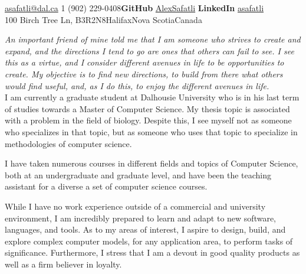 \documentclass[10pt,a4paper]{article}
\begin{document}
 


\noindent\href{mailto:asafatli@dal.ca}{asafatli@dal.ca}\bull
\textsmaller{+}1 (902) 229-0408\bull \textbf{GitHub} \href{https://github.com/AlexSafatli/}{AlexSafatli}\bull
\textbf{LinkedIn} \href{http://ca.linkedin.com/in/asafatli}{asafatli}\\
100 Birch Tree Ln, B3R2N8\bull Halifax\bull Nova Scotia\bull Canada

\spacedhrule{0.9em}{-0.4em} %


\vspace{-1.3em}

\begin{multicols}{2}

\noindent \textit{An important friend of mine told me that I am someone who strives to create and expand, and the directions I tend to go are ones that others can fail to see. I see this as a virtue, and I consider different avenues in life to be opportunities to create. My objective is to find new directions, to build from there what others would find useful, and, as I do this, to enjoy the different avenues in life.}\\

I am currently a graduate student at Dalhousie University who is in his last term of studies towards a Master of Computer Science. My thesis topic is associated with a problem in the field of biology. Despite this, I see myself not as someone who specializes in that topic, but as someone who uses that topic to specialize in methodologies of computer science.

I have taken numerous courses in different fields and topics of Computer Science, both at an undergraduate and graduate level, and have been the teaching assistant for a diverse a set of computer science courses. 

While I have no work experience outside of a commercial and university environment, I am incredibly prepared to learn and adapt to new software, languages, and tools. As to my areas of interest, I aspire to design, build, and explore complex computer models, for any application area, to perform tasks of significance. Furthermore, I stress that I am a devout in good quality products as well as a firm believer in loyalty.

\end{multicols}
\end{document}
